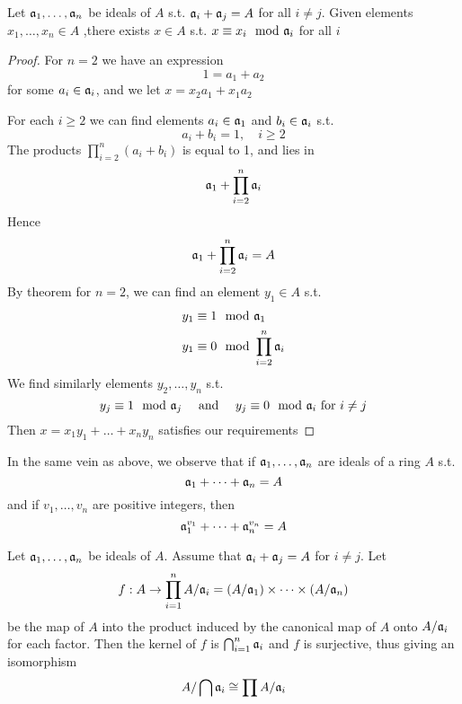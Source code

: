 \documentclass[11pt]{article}
\begin{document}
\begin{theorem}
Let \(\mathfrak{a}_1,\dots,\mathfrak{a}_n\) be ideals of \(A\) s.t. \(\mathfrak{a}_i+\mathfrak{a}_j=A\) for all \(i\neq j\). Given
elements \(x_1,\dots,x_n\in A\) ,there exists \(x\in A\) s.t. \(x\equiv x_i\mod{\mathfrak{a}}_i\) for all \(i\)
\end{theorem}

\begin{proof}
For \(n=2\) we have an expression
\begin{equation*}
1=a_1+a_2
\end{equation*}
for some \(a_i\in\mathfrak{a}_i\), and we let \(x=x_2a_1+x_1a_2\)

For each \(i\ge 2\) we can find elements \(a_i\in\mathfrak{a}_1\) and \(b_i\in\mathfrak{a}_i\) s.t.
\begin{equation*}
a_i+b_i=1,\quad i\ge 2
\end{equation*}
The products \(\prod_{i=2}^n(a_i+b_i)\) is equal to 1, and lies in
\begin{equation*}
\mathfrak{a}_1+\prod_{i=2}^n\mathfrak{a}_i
\end{equation*}
Hence
\begin{equation*}
\mathfrak{a}_1+\prod_{i=2}^n\mathfrak{a}_i=A
\end{equation*}
By theorem for \(n=2\), we can find an element \(y_1\in A\) s.t.
\begin{align*}
&y_1\equiv 1\mod{\mathfrak{a}}_1\\
&y_1\equiv 0\mod\prod_{i=2}^n\mathfrak{a}_i
\end{align*}
We find similarly elements \(y_2,\dots,y_n\) s.t.
\begin{equation*}
y_j\equiv 1\mod{\mathfrak{a}}_j \quad\text{ and }\quad y_j\equiv 0\mod{\mathfrak{a}}_i\text{ for }i\neq j
\end{equation*}
Then \(x=x_1y_1+\dots+x_ny_n\) satisfies our requirements
\end{proof}

In the same vein as above, we observe that if \(\mathfrak{a}_1,\dots,\mathfrak{a}_n\) are ideals of a ring \(A\) s.t.
\begin{equation*}
\mathfrak{a}_1+\dots+\mathfrak{a}_n=A
\end{equation*}
and if \(v_1,\dots,v_n\) are positive integers, then
\begin{equation*}
\mathfrak{a}_1^{v_1}+\dots+\mathfrak{a}_n^{v_n}=A
\end{equation*}
\label{Problem2}

\begin{corollary}[]
Let \(\mathfrak{a}_1,\dots,\mathfrak{a}_n\) be ideals of \(A\). Assume that \(\mathfrak{a}_i+\mathfrak{a}_j=A\) for \(i\neq j\). Let
\begin{equation*}
f:A\to\prod_{i=1}^nA/\mathfrak{a}_i=(A/\mathfrak{a}_1)\times\dots\times(A/\mathfrak{a}_n)
\end{equation*}
be the map of \(A\) into the product induced by the canonical map of \(A\) onto \(A/\mathfrak{a}_i\) for each
factor. Then the kernel of \(f\) is \(\bigcap_{i=1}^n\mathfrak{a}_i\) and \(f\) is surjective, thus giving an
isomorphism
\begin{equation*}
A/\bigcap\mathfrak{a}_i\cong\prod A/\mathfrak{a}_i
\end{equation*}
\end{corollary}
\end{document}
